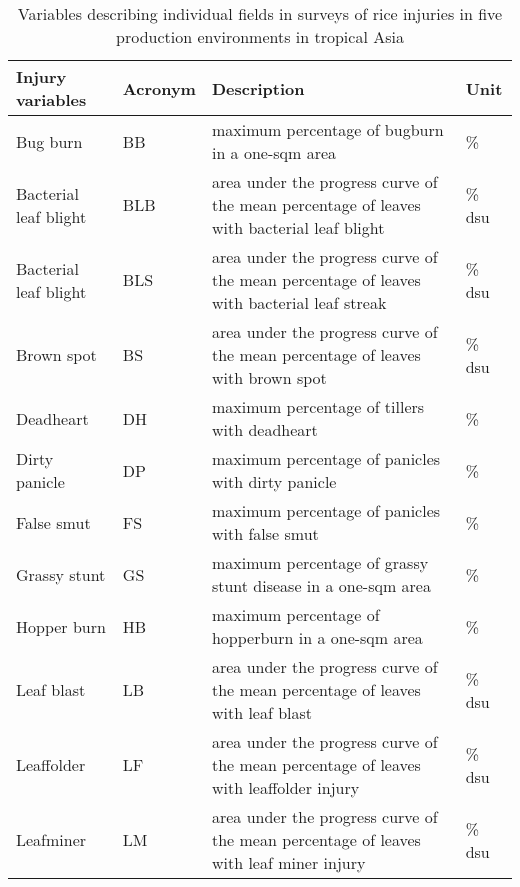 \begin{landscape}
\begin{table}[!h]
\centering
\caption{Variables describing individual fields in surveys of rice injuries in five production environments in tropical Asia}
\label{table:variable_des}
\begin{tabular}{llll}
\hline
Injury variables              & Acronym & Description                                                                              & Unit  \\
\hline
Bug burn              & BB      & maximum percentage of bugburn in a one-sqm area                                           & \%     \\
Bacterial leaf blight & BLB     & area under the progress curve of the mean percentage of leaves with bacterial leaf blight & \% dsu \\
Bacterial leaf blight & BLS     & area under the progress curve of the mean percentage of leaves with bacterial leaf streak & \% dsu \\
Brown spot            & BS      & area under the progress curve of the mean percentage of leaves with brown spot            & \% dsu \\
Deadheart             & DH      & maximum percentage of tillers with deadheart                                              & \%     \\
Dirty panicle         & DP      & maximum percentage of panicles with dirty panicle                                         & \%     \\
False smut            & FS      & maximum percentage of panicles with false smut                                            & \%     \\
Grassy stunt   & GS      & maximum percentage of grassy stunt disease in a one-sqm area                              & \%     \\
Hopper burn           & HB      & maximum percentage of hopperburn in a one-sqm area                                        & \%     \\
Leaf blast            & LB      & area under the progress curve of the mean percentage of leaves with leaf blast            & \% dsu \\
Leaffolder            & LF      & area under the progress curve of the mean percentage of leaves with leaffolder injury     & \% dsu \\
Leafminer             & LM      & area under the progress curve of the mean percentage of leaves with leaf miner injury     & \% dsu \\

\end{tabular}
\end{table}
\end{landscape}
